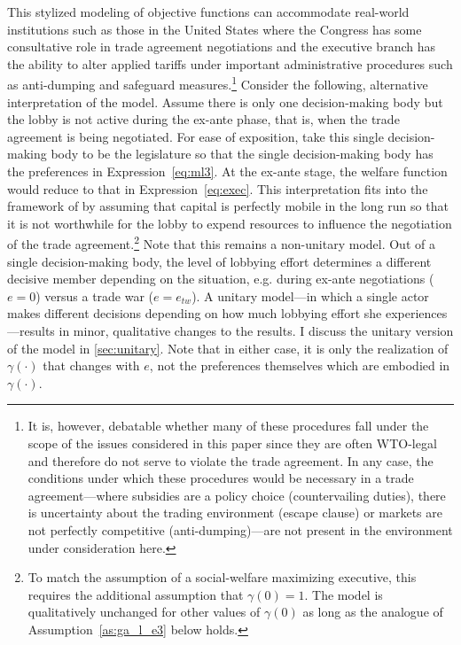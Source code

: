 \documentclass[authoryear, review]{elsarticle}
\newcommand{\ga}{\gamma}
\begin{document}
This stylized modeling of objective functions can accommodate real-world institutions such as those in the United States where the Congress has some consultative role in trade agreement negotiations and the executive branch has the ability to alter applied tariffs under important administrative procedures such as anti-dumping and safeguard measures.\footnote{It is, however, debatable whether many of these procedures fall under the scope of the issues considered in this paper since they are often WTO-legal and therefore do not serve to violate the trade agreement. In any case, the conditions under which these procedures would be necessary in a trade agreement---where subsidies are a policy choice (countervailing duties), there is uncertainty about the trading environment (escape clause) or markets are not perfectly competitive (anti-dumping)---are not present in the environment under consideration here.} Consider the following, alternative interpretation of the model. Assume there is only one decision-making body but the lobby is not active during the ex-ante phase, that is, when the trade agreement is being negotiated. For ease of exposition, take this single decision-making body to be the legislature so that the single decision-making body has the preferences in Expression~\ref{eq:ml3}. At the ex-ante stage, the welfare function would reduce to that in Expression~\ref{eq:exec}. This interpretation fits into the framework of \citet{mrc2007} by assuming that capital is perfectly mobile in the long run so that it is not worthwhile for the lobby to expend resources to influence the negotiation of the trade agreement.\footnote{To match the assumption of a social-welfare maximizing executive, this requires the additional assumption that $\ga(0)=1.$ The model is qualitatively unchanged for other values of $\ga(0)$ as long as the analogue of Assumption~\ref{as:ga_l_e3} below holds.} Note that this remains a non-unitary model. Out of a single decision-making body, the level of lobbying effort determines a different decisive member depending on the situation, e.g. during ex-ante negotiations ($e=0$) versus a trade war ($e=e_{tw}$). A unitary model---in which a single actor makes different decisions depending on how much lobbying effort she experiences---results in minor, qualitative changes to the results. I discuss the unitary version of the model in \ref{sec:unitary}. Note that in either case, it is only the realization of $\ga(\cdot)$ that changes with $e$, not the preferences themselves which are embodied in $\ga(\cdot)$.
\end{document}
